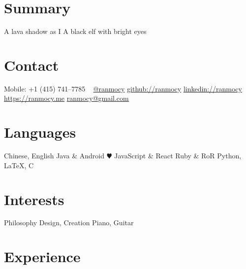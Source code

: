 \documentclass[]{friggeri-cv} %
\begin{document}


\begin{aside} %
  \section{Summary}
  A lava shadow as I
  A black elf
  with bright eyes
  \section{Contact}
  Mobile:
  +1 (415) 741--7785
  ~
  \href{https://twitter.com/ranmocy}{@ranmocy}
  \href{https://github.com/ranmocy}{github://ranmocy}
  \href{https://www.linkedin.com/in/ranmocy}{linkedin://ranmocy}
  \href{https://ranmocy.me}{https://ranmocy.me}
  \href{mailto:ranmocy+cv@gmail.com}{ranmocy@gmail.com}
  \section{Languages}
  Chinese, English
  Java \& Android {\color{red} $\varheartsuit$}
  JavaScript \& React
  Ruby \& RoR
  Python, LaTeX, C
  \section{Interests}
  Philosophy
  Design, Creation
  Piano, Guitar
\end{aside}


\section{Experience}
\end{document}
